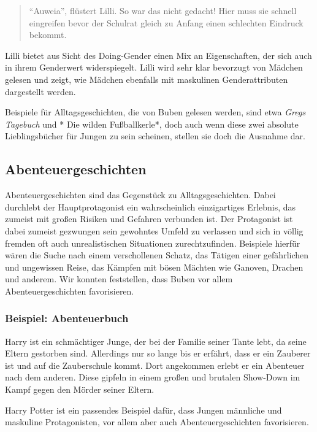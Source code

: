 \begin{quote}
``Auweia'', flüstert Lilli. So war das nicht gedacht! Hier muss sie
schnell eingreifen bevor der Schulrat gleich zu Anfang einen schlechten
Eindruck bekommt. \parencite[][47
]{KNISTER1999}
\end{quote}

Lilli bietet aus Sicht des Doing-Gender einen Mix an Eigenschaften, der
sich auch in ihrem Genderwert widerspiegelt. Lilli wird sehr klar
bevorzugt von Mädchen gelesen und zeigt, wie Mädchen ebenfalls mit
maskulinen Genderattributen dargestellt werden.

Beispiele für Alltagsgeschichten, die von Buben gelesen werden, sind
etwa \emph{Gregs Tagebuch} und * Die wilden Fußballkerle*, doch auch
wenn diese zwei absolute Lieblingsbücher für Jungen zu sein scheinen,
stellen sie doch die Ausnahme dar.

\subsection{Abenteuergeschichten}

Abenteuergeschichten sind das Gegenstück zu Alltagsgeschichten. Dabei
durchlebt der Hauptprotagonist ein wahrscheinlich einzigartiges
Erlebnis, das zumeist mit großen Risiken und Gefahren verbunden ist. Der
Protagonist ist dabei zumeist gezwungen sein gewohntes Umfeld zu
verlassen und sich in völlig fremden oft auch unrealistischen
Situationen zurechtzufinden. Beispiele hierfür wären die Suche nach
einem verschollenen Schatz, das Tätigen einer gefährlichen und
ungewissen Reise, das Kämpfen mit bösen Mächten wie Ganoven, Drachen und
anderem. Wir konnten feststellen, dass Buben vor allem
Abenteuergeschichten favorisieren.

\subsubsection{Beispiel: Abenteuerbuch}

Harry ist ein schmächtiger Junge, der bei der Familie seiner Tante lebt,
da seine Eltern gestorben sind. Allerdings nur so lange bis er erfährt,
dass er ein Zauberer ist und auf die Zauberschule kommt. Dort angekommen
erlebt er ein Abenteuer nach dem anderen. Diese gipfeln in einem großen
und brutalen Show-Down im Kampf gegen den Mörder seiner Eltern.
\parencite{Rowling1998}

Harry Potter ist ein passendes Beispiel dafür, dass Jungen männliche und
maskuline Protagonisten, vor allem aber auch Abenteuergeschichten
favorisieren.

